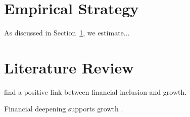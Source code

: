 \documentclass[11pt,a4paper]{article}
\begin{document}
\section{Empirical Strategy}
\label{sec:strategy}

As discussed in Section~\ref{sec:strategy}, we estimate...

\section{Literature Review}

\citet{nandi2022financial} find a positive link between
financial inclusion and growth.

Financial deepening supports growth
\citep{nandi2022financial}.


\end{document}
